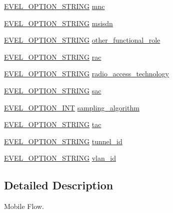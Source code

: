 \begin{DoxyCompactItemize}
\item 
\hyperlink{evel_8h_a0de5113a7b72de93c0c7b644f7ea7ec3}{E\+V\+E\+L\+\_\+\+O\+P\+T\+I\+O\+N\+\_\+\+S\+T\+R\+I\+NG} \hyperlink{structevent__mobile__flow_abc8c594121f138f4bd98e7e90063c287}{mnc}
\item 
\hyperlink{evel_8h_a0de5113a7b72de93c0c7b644f7ea7ec3}{E\+V\+E\+L\+\_\+\+O\+P\+T\+I\+O\+N\+\_\+\+S\+T\+R\+I\+NG} \hyperlink{structevent__mobile__flow_a22041860a791e790c2bff4736f074b13}{msisdn}
\item 
\hyperlink{evel_8h_a0de5113a7b72de93c0c7b644f7ea7ec3}{E\+V\+E\+L\+\_\+\+O\+P\+T\+I\+O\+N\+\_\+\+S\+T\+R\+I\+NG} \hyperlink{structevent__mobile__flow_a2fdb547b291d798b4b57de6b1489b383}{other\+\_\+functional\+\_\+role}
\item 
\hyperlink{evel_8h_a0de5113a7b72de93c0c7b644f7ea7ec3}{E\+V\+E\+L\+\_\+\+O\+P\+T\+I\+O\+N\+\_\+\+S\+T\+R\+I\+NG} \hyperlink{structevent__mobile__flow_aa1d81531978633590263b8e8847c8efa}{rac}
\item 
\hyperlink{evel_8h_a0de5113a7b72de93c0c7b644f7ea7ec3}{E\+V\+E\+L\+\_\+\+O\+P\+T\+I\+O\+N\+\_\+\+S\+T\+R\+I\+NG} \hyperlink{structevent__mobile__flow_aae016bf13613264801561c3e89ffe452}{radio\+\_\+access\+\_\+technology}
\item 
\hyperlink{evel_8h_a0de5113a7b72de93c0c7b644f7ea7ec3}{E\+V\+E\+L\+\_\+\+O\+P\+T\+I\+O\+N\+\_\+\+S\+T\+R\+I\+NG} \hyperlink{structevent__mobile__flow_ade1ab48ebf79ec3fa205293cb9f19b34}{sac}
\item 
\hyperlink{evel_8h_a452d825778d1c2368a54b8f689a25ba7}{E\+V\+E\+L\+\_\+\+O\+P\+T\+I\+O\+N\+\_\+\+I\+NT} \hyperlink{structevent__mobile__flow_af2e05437a8986a9a3fe155481c866844}{sampling\+\_\+algorithm}
\item 
\hyperlink{evel_8h_a0de5113a7b72de93c0c7b644f7ea7ec3}{E\+V\+E\+L\+\_\+\+O\+P\+T\+I\+O\+N\+\_\+\+S\+T\+R\+I\+NG} \hyperlink{structevent__mobile__flow_a7345060c916d0cf3885a1cf4654e816b}{tac}
\item 
\hyperlink{evel_8h_a0de5113a7b72de93c0c7b644f7ea7ec3}{E\+V\+E\+L\+\_\+\+O\+P\+T\+I\+O\+N\+\_\+\+S\+T\+R\+I\+NG} \hyperlink{structevent__mobile__flow_adcab62a3ae56b62f949227004a0e75fc}{tunnel\+\_\+id}
\item 
\hyperlink{evel_8h_a0de5113a7b72de93c0c7b644f7ea7ec3}{E\+V\+E\+L\+\_\+\+O\+P\+T\+I\+O\+N\+\_\+\+S\+T\+R\+I\+NG} \hyperlink{structevent__mobile__flow_ade92900e6abdc8c2f1a72db525110e92}{vlan\+\_\+id}
\end{DoxyCompactItemize}


\subsection{Detailed Description}
Mobile Flow. 

